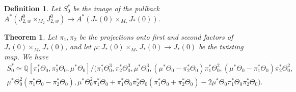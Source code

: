 \documentclass[11pt]{amsart}
\newtheorem{theorem}{Theorem}
\newtheorem{definition}{Definition}[section]
\numberwithin{theorem}{section}
\numberwithin{lemma}{section}
\theoremstyle{definition}
\newcommand{\ri}{\rightarrow}
\newcommand{\Q}{\mathbb{Q}}
\newcommand{\T}{\Theta}
\begin{document}
\begin{definition}
	Let $S_{0}^*$ be the image of the pullback $ A^*(J^0_{2,w}\times_{M_2}J^0_{2,w})\ri A^*(J_*(0)\times_{M_*}J_*(0))$.
\end{definition}
\begin{theorem}\label{jxj}
  Let $\pi_1,\pi_2$ be the projections onto first and second factors of $J_*(0)\times_{M_*}J_*(0)$, and let $\mu:J_*(0)\times_{M_*}J_*(0)\ri J_*(0)$ be the twisting map. We have
  \begin{gather*}S_{0}^*\simeq \Q[\pi_1^*\T_0,\pi_2^*\T_0, \mu^*\T_0]/
    (\pi_1^*\T_0^3,\pi_2^*\T_0^3, \mu^*\T_0^3,(\mu^*\T_0-\pi_2^*\T_0)\pi_1^*\T_0^2,(\mu^*\T_0-\pi_1^*\T_0)\pi_2^*\T_0^2, \\
     \mu^*\T_0^2(\pi_1^*\T_0-\pi_2^*\T_0),\mu^*\T_0^2\pi_1^*\T_0+\pi_1^*\T_0\pi_2^*\T_0(\pi_1^*\T_0+\pi_2^*\T_0)-2\mu^*\T_0\pi_1^*\T_0\pi_2^*\T_0
	).\end{gather*}
\end{theorem}
\end{document}
